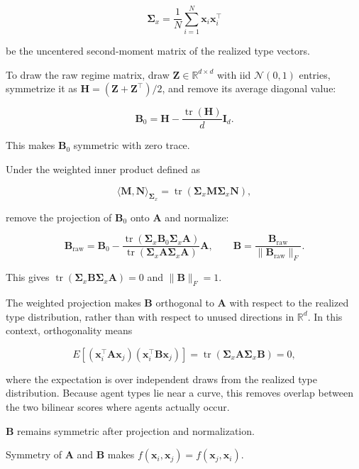 \documentclass[11pt]{article}
\begin{document}
\[\boldsymbol{\Sigma}_x = \frac{1}{N} \sum_{i=1}^N \mathbf{x}_i \mathbf{x}_i^\top\]

be the uncentered second-moment matrix of the realized type vectors.

To draw the raw regime matrix, draw \(\mathbf{Z}\in\mathbb{R}^{d\times d}\) with iid \(\mathcal{N}(0,1)\) entries, symmetrize it as \(\mathbf{H}=(\mathbf{Z}+\mathbf{Z}^\top)/2\), and remove its average diagonal value:

\[
\mathbf{B}_0 = \mathbf{H} - \frac{\operatorname{tr}(\mathbf{H})}{d}\mathbf{I}_d.
\]

This makes \(\mathbf{B}_0\) symmetric with zero trace.

Under the weighted inner product defined as

\[\langle \mathbf{M}, \mathbf{N} \rangle_{\boldsymbol{\Sigma}_x} = \operatorname{tr}(\boldsymbol{\Sigma}_x \mathbf{M} \boldsymbol{\Sigma}_x \mathbf{N}),\]

remove the projection of \(\mathbf{B}_0\) onto \(\mathbf{A}\) and normalize:

\[\mathbf{B}_{\text{raw}} = \mathbf{B}_0 - \frac{\operatorname{tr}(\boldsymbol{\Sigma}_x \mathbf{B}_0 \boldsymbol{\Sigma}_x \mathbf{A})}{\operatorname{tr}(\boldsymbol{\Sigma}_x \mathbf{A} \boldsymbol{\Sigma}_x \mathbf{A})} \mathbf{A}, \qquad \mathbf{B} = \frac{\mathbf{B}_{\text{raw}}}{\lVert \mathbf{B}_{\text{raw}} \rVert_F}.\]

This gives \(\operatorname{tr}(\boldsymbol{\Sigma}_x\mathbf{B}\boldsymbol{\Sigma}_x\mathbf{A})=0\) and \(\|\mathbf{B}\|_F=1\).

The weighted projection makes \(\mathbf{B}\) orthogonal to \(\mathbf{A}\) with respect to the realized type distribution, rather than with respect to unused directions in \(\mathbb{R}^d\). In this context, orthogonality means

\[E\!\left[(\mathbf{x}_i^\top\mathbf{A}\mathbf{x}_j)(\mathbf{x}_i^\top\mathbf{B}\mathbf{x}_j)\right] = \operatorname{tr}(\boldsymbol{\Sigma}_x\mathbf{A}\boldsymbol{\Sigma}_x\mathbf{B}) = 0,\]

where the expectation is over independent draws from the realized type distribution. Because agent types lie near a curve, this removes overlap between the two bilinear scores where agents actually occur.

\(\mathbf{B}\) remains symmetric after projection and normalization.

Symmetry of \(\mathbf{A}\) and \(\mathbf{B}\) makes \(f(\mathbf{x}_i,\mathbf{x}_j)=f(\mathbf{x}_j,\mathbf{x}_i)\).
\end{document}
